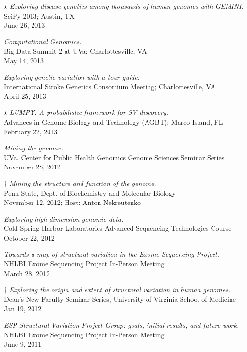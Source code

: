 \documentclass[margin,line]{cv}
\begin{document}
\begin{resume}
    $\star$ \textit{Exploring disease genetics among thousands of human genomes
	with GEMINI.} \\
    SciPy 2013; Austin, TX \\
    June 26, 2013

    \textit{Computational Genomics.} \\
    Big Data Summit 2 at UVa; Charlottesville, VA \\
    May 14, 2013

    \textit{Exploring genetic variation with a tour guide.} \\
    International Stroke Genetics Consortium Meeting; Charlottesville, VA \\
    April 25, 2013

    $\star$ \textit{LUMPY: A probabilistic framework for SV discovery.} \\
    Advances in Genome Biology and Technology (AGBT); Marco Island, FL \\
    February 22, 2013

    \textit{Mining the genome.} \\
    UVa. Center for Public Health Genomics Genome Sciences Seminar Series \\
    November 28, 2012

    $\dagger$ \textit{Mining the structure and function of the genome.} \\
    Penn State, Dept. of Biochemistry and Molecular Biology \\
    November 12, 2012; Host: Anton Nekreutenko

    \textit{Exploring high-dimension genomic data.} \\
    Cold Spring Harbor Laboratories Advanced Sequencing Technologies Course \\
    October 22, 2012

    \textit{Towards a map of structural variation in the Exome Sequencing Project.} \\
    NHLBI Exome Sequencing Project In-Person Meeting \\
    March 28, 2012

    $\dagger$ \textit{Exploring the origin and extent of structural variation in human genomes.} \\
    Dean’s New Faculty Seminar Series, University of Virginia School of Medicine \\
    Jan 19, 2012

    \textit{ESP Structural Variation Project Group: goals, initial results, and future work.} \\
    NHLBI Exome Sequencing Project In-Person Meeting \\
    June 9, 2011


\end{resume}
\end{document}
